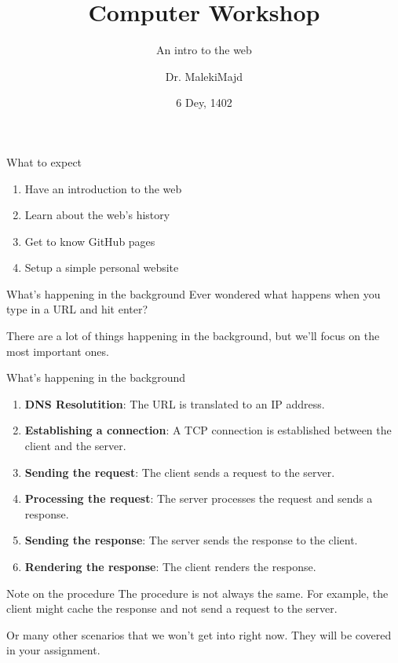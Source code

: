 \documentclass{beamer}
\title{Computer Workshop}
\subtitle{An intro to the web}
\author{Dr. MalekiMajd}
\institute[IUST]{Iran University Of Science And Technology}
\date{6 Dey, 1402}
\begin{document}
\begin{frame}
    \maketitle
\end{frame}

\begin{frame}{What to expect}
\begin{enumerate}
    \item Have an introduction to the web
    \item Learn about the web's history
    \item Get to know GitHub pages
    \item Setup a simple personal website
\end{enumerate} 
\end{frame}

\begin{frame}{What's happening in the background}
    Ever wondered what happens when you type in a URL and hit enter?
    
    There are a lot of things happening in the background, but we'll focus on the most important ones.
\end{frame}

\begin{frame}{What's happening in the background}
    \begin{enumerate}
        \item \textbf{DNS Resolutition}: The URL is translated to an IP address.
        \item \textbf{Establishing a connection}: A TCP connection is established between the client and the server.
        \item \textbf{Sending the request}: The client sends a request to the server.
        \item \textbf{Processing the request}: The server processes the request and sends a response.
        \item \textbf{Sending the response}: The server sends the response to the client.
        \item \textbf{Rendering the response}: The client renders the response.
    \end{enumerate}
\end{frame}

\begin{frame}{Note on the procedure}
    The procedure is not always the same. For example, the client might cache the response and not send a request to the server.

    Or many other scenarios that we won't get into right now. They will be covered in your assignment.
\end{frame}
\end{document}
